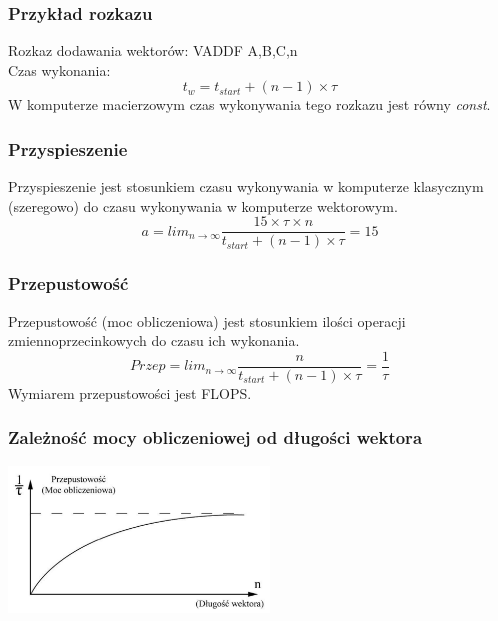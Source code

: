 		\subsubsection{Przykład rozkazu}
			Rozkaz dodawania wektorów: VADDF A,B,C,n\\
			Czas wykonania:
			$$t_{w}=t_{start}+(n-1)\times\tau$$
			W komputerze macierzowym czas wykonywania tego rozkazu jest równy \emph{const}.
		
		\subsubsection{Przyspieszenie}
			Przyspieszenie jest stosunkiem czasu wykonywania w komputerze klasycznym (szeregowo) do czasu wykonywania w komputerze wektorowym.
			$$a=lim_{n \to \infty}\frac{15\times\tau\times n}{t_{start}+(n-1)\times\tau}=15$$
		
		\subsubsection{Przepustowość}
			Przepustowość (moc obliczeniowa) jest stosunkiem ilości operacji zmiennoprzecinkowych do czasu ich wykonania.
			$$Przep=lim_{n \to \infty}\frac{n}{t_{start}+(n-1)\times\tau}=\frac{1}{\tau}$$
			Wymiarem przepustowości jest FLOPS.
			
		\subsubsection{Zależność mocy obliczeniowej od długości wektora}
			\begin{center}
				\includegraphics[width=0.52\textwidth]{./images/simd01}
			\end{center}
	
